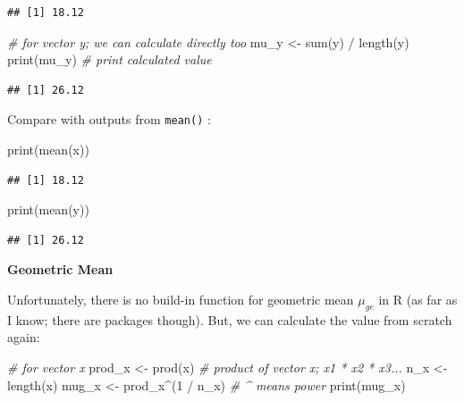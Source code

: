 \documentclass[
]{article}
\newenvironment{Shaded}{\begin{snugshade}}{\end{snugshade}}
\newcommand{\CommentTok}[1]{\textcolor[rgb]{0.56,0.35,0.01}{\textit{#1}}}
\newcommand{\DecValTok}[1]{\textcolor[rgb]{0.00,0.00,0.81}{#1}}
\newcommand{\FunctionTok}[1]{\textcolor[rgb]{0.00,0.00,0.00}{#1}}
\newcommand{\NormalTok}[1]{#1}
\newcommand{\OtherTok}[1]{\textcolor[rgb]{0.56,0.35,0.01}{#1}}
\newcommand{\SpecialCharTok}[1]{\textcolor[rgb]{0.00,0.00,0.00}{#1}}
\begin{document}
\begin{verbatim}
## [1] 18.12
\end{verbatim}

\begin{Shaded}
\begin{Highlighting}[]
\CommentTok{\# for vector y; we can calculate directly too}
\NormalTok{mu\_y }\OtherTok{\textless{}{-}} \FunctionTok{sum}\NormalTok{(y) }\SpecialCharTok{/} \FunctionTok{length}\NormalTok{(y)}
\FunctionTok{print}\NormalTok{(mu\_y) }\CommentTok{\# print calculated value}
\end{Highlighting}
\end{Shaded}

\begin{verbatim}
## [1] 26.12
\end{verbatim}

Compare with outputs from \texttt{mean()} :

\begin{Shaded}
\begin{Highlighting}[]
\FunctionTok{print}\NormalTok{(}\FunctionTok{mean}\NormalTok{(x))}
\end{Highlighting}
\end{Shaded}

\begin{verbatim}
## [1] 18.12
\end{verbatim}

\begin{Shaded}
\begin{Highlighting}[]
\FunctionTok{print}\NormalTok{(}\FunctionTok{mean}\NormalTok{(y))}
\end{Highlighting}
\end{Shaded}

\begin{verbatim}
## [1] 26.12
\end{verbatim}

\textbf{Geometric Mean}

Unfortunately, there is no build-in function for geometric mean \(\mu_{ge}\) in R (as far as I know; there are packages though). But, we can calculate the value from scratch again:

\begin{Shaded}
\begin{Highlighting}[]
\CommentTok{\# for vector x}
\NormalTok{prod\_x }\OtherTok{\textless{}{-}} \FunctionTok{prod}\NormalTok{(x) }\CommentTok{\# product of vector x; x1 * x2 * x3...}
\NormalTok{n\_x }\OtherTok{\textless{}{-}} \FunctionTok{length}\NormalTok{(x)}
\NormalTok{mug\_x }\OtherTok{\textless{}{-}}\NormalTok{ prod\_x}\SpecialCharTok{\^{}}\NormalTok{(}\DecValTok{1} \SpecialCharTok{/}\NormalTok{ n\_x) }\CommentTok{\# \^{} means power}
\FunctionTok{print}\NormalTok{(mug\_x)}
\end{Highlighting}
\end{Shaded}
\end{document}
